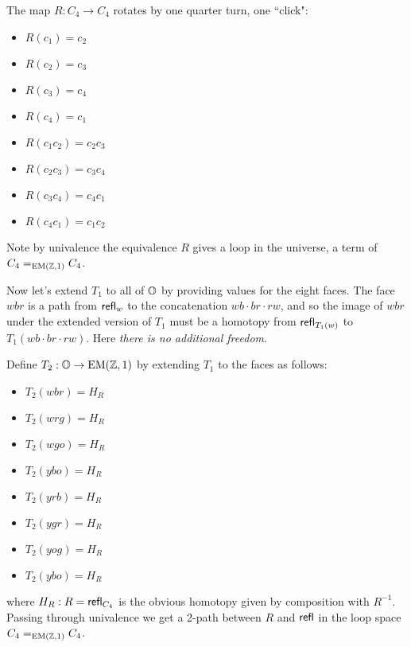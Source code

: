 \begin{mydef}
\label{def:octahedron_holonomy}
The map \( R:C_4\to C_4 \) rotates by one quarter turn, one ``click":
\begin{multicols}{2}
\begin{itemize}
\item \( R(c_1) = c_2 \)
\item \( R(c_2) = c_3 \)
\item \( R(c_3) = c_4 \)
\item \( R(c_4) = c_1 \)
\item \( R(c_1c_2) = c_2c_3 \)
\item \( R(c_2c_3) = c_3c_4 \)
\item \( R(c_3c_4) = c_4c_1 \)
\item \( R(c_4c_1) = c_1c_2 \)
\end{itemize}
\end{multicols}
\end{mydef}

Note by univalence the equivalence \( R \) gives a loop in the universe, a term of \( C_4=_{\mathrm{EM}(\mathbb{Z},1)}C_4 \).

Now let's extend \( T_1 \) to all of \( \mathbb{O} \) by providing values for the eight faces. The face \( wbr \) is a path from \( \mathsf{refl}_w \) to the concatenation \( wb\cdot br\cdot rw \), and so the image of \( wbr \) under the extended version of \( T_1 \) must be a homotopy from \( \mathsf{refl}_{T_1(w)} \) to \( T_1(wb\cdot br\cdot rw) \). Here \emph{there is no additional freedom}.

\begin{mydef}
\label{def:octahedron_curvature}
Define \( T_2:\mathbb{O}\to\mathrm{EM}(\mathbb{Z},1) \) by extending \( T_1 \) to the faces as follows:
\begin{multicols}{2}
\begin{itemize}
\item \( T_2(wbr)=H_R \) 
\item \( T_2(wrg)=H_R \)
\item \( T_2(wgo)=H_R \)
\item \( T_2(ybo)=H_R \)
\item \( T_2(yrb)=H_R \) 
\item \( T_2(ygr)=H_R \)
\item \( T_2(yog)=H_R \)
\item \( T_2(ybo)=H_R \)
\end{itemize}
\end{multicols}
where \( H_R:R=\mathsf{refl}_{C_4} \) is the obvious homotopy given by composition with \( R^{-1} \). Passing through univalence we get a 2-path between \( R \) and \( \mathsf{refl} \) in the loop space \( C_4=_{\mathrm{EM}(\mathbb{Z},1)}C_4 \).
\end{mydef}

